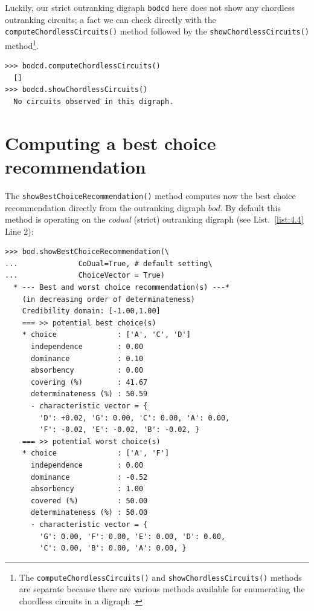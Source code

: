 Luckily, our strict outranking digraph \texttt{bodcd} here does not show any chordless outranking circuits; a fact we can check directly with the \texttt{computeChordlessCir\-cuits()} method followed by the \texttt{showChordlessCircuits()} method\footnote{The \texttt{computeChordlessCircuits()} and \texttt{showChordlessCircuits()} methods are separate because there are various methods available for enumerating the chordless circuits in a digraph \citep{BIS-2010}.}.
\begin{lstlisting}
>>> bodcd.computeChordlessCircuits()
  []  
>>> bodcd.showChordlessCircuits()
  No circuits observed in this digraph.
\end{lstlisting}

\section{Computing a best choice recommendation}
\label{sec:4.5}

The \texttt{showBestChoiceRecommendation()} method computes now the \Rubis best choice recommendation directly from the outranking digraph $bod$. By default this method is operating on the \emph{codual} (strict) outranking digraph (see List.~\vref{list:4.4} Line 2):
\begin{lstlisting}[caption={Computing the best choice recommendation},label=list:4.4]
>>> bod.showBestChoiceRecommendation(\
...              CoDual=True, # default setting\
...              ChoiceVector = True)   
  * --- Best and worst choice recommendation(s) ---*
    (in decreasing order of determinateness)   
    Credibility domain: [-1.00,1.00]
    === >> potential best choice(s)
    * choice              : ['A', 'C', 'D']
      independence        : 0.00
      dominance           : 0.10
      absorbency          : 0.00
      covering (%)        : 41.67
      determinateness (%) : 50.59
      - characteristic vector = {
        'D': +0.02, 'G': 0.00, 'C': 0.00, 'A': 0.00,
        'F': -0.02, 'E': -0.02, 'B': -0.02, }
    === >> potential worst choice(s) 
    * choice              : ['A', 'F']
      independence        : 0.00
      dominance           : -0.52
      absorbency          : 1.00
      covered (%)         : 50.00
      determinateness (%) : 50.00
      - characteristic vector = {
        'G': 0.00, 'F': 0.00, 'E': 0.00, 'D': 0.00,
        'C': 0.00, 'B': 0.00, 'A': 0.00, }
\end{lstlisting}				  

